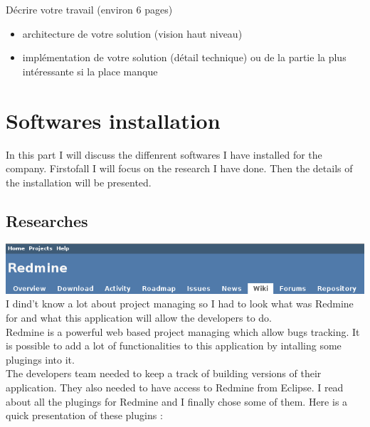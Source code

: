 

Décrire votre travail (environ 6 pages)
\begin{itemize}
	\item architecture de votre solution (vision haut niveau)
	\item implémentation de votre solution (détail technique) ou de la partie la plus intéressante si la place manque

\end{itemize}
\newpage
\section{Softwares installation}
In this part I will discuss the diffenrent softwares I have installed for the company. 
Firstofall I will focus on the research I have done. Then the details of the installation 
will be presented. 
\subsection{Researches}

\includegraphics[width=\textwidth]{Images/redmine.png}
\newline
\\
I dind't know a lot about project managing so I had to look what was Redmine for and what
 this application will allow the developers to do. \\ 
Redmine is a powerful web based project managing which allow bugs tracking.
 It is possible to add a lot of functionalities to this application by intalling some 
 plugings into it. \\ 
 The developers team needed to keep a track of building versions of their application.
 They also needed to have access to Redmine from Eclipse. 
I read about all the plugings for Redmine and I finally chose some of them. 
Here is a quick presentation of these plugins :  

	 

\newpage

\newpage

\cleardoublepage


